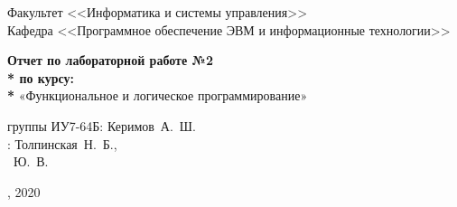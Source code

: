 \begin{titlepage}
\vspace{2em}

\hrulefill

\begin{center}
	\vspace{0pt plus2fill} %
	{\large
	Факультет  <<Информатика и системы управления>>\\
	Кафедра  <<Программное обеспечение ЭВМ и информационные технологии>>
	}
\end{center}

{\Large
\begin{center}
	\textbf{Отчет по лабораторной работе №2 \\* по курсу: \\* } «Функциональное и логическое программирование» \\
\end{center}
}
%
\vspace{0pt plus4fill} %

\begin{center}
\newlength{\ML}
 группы ИУ7-64Б:\hspace{0.2cm} Керимов~А.~Ш.\\
:\hspace{0.2cm} Толпинская~Н.~Б.,\\
~Ю.~В.

\end{center}
%

\vspace{0pt plus4fill} %
{, 2020\par}
\end{titlepage}
